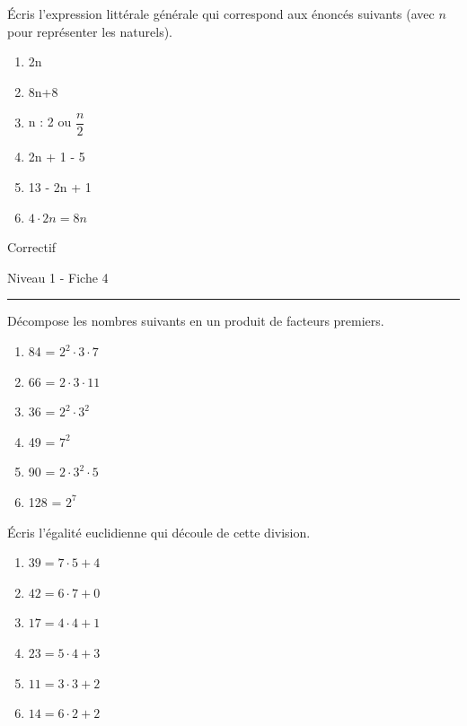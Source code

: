 \documentclass[12pt,parskip=half-, twoside=semi]{scrartcl}
\begin{document}
    \begin{exercise}
        Écris l'expression littérale générale qui correspond aux énoncés suivants (avec \(n\) pour représenter les naturels).
        \begin{enumerate}[cols=2]
            \item 2n
            \item 8n+8
            \item n : 2 ou \(\dfrac{n}{2}\) 
            \item 2n + 1 - 5 
            \item 13 - 2n + 1 
            \item \(4 \cdot 2n = 8n\) 
        \end{enumerate}
      \end{exercise}

\newpage


\begin{center}
  \bfseries
  \begin{Huge}
    Correctif
  \end{Huge}
  \smallbreak
  \begin{large}
    Niveau 1  - Fiche 4
  \end{large}
  \smallbreak
  \rule[10pt]{.5\linewidth}{1 pt}
\end{center}

\setcounter{exercise}{0}
      
      \begin{exercise}
        Décompose les nombres suivants en un produit de facteurs premiers.

          \begin{enumerate}[cols=3]
              \item 84 = $2^2 \cdot 3 \cdot 7$
              \item 66 = $2 \cdot 3 \cdot 11$
              \item 36 = $2^2 \cdot 3^2$
              \item 49 = $7^2$
              \item 90 = $2 \cdot 3^2 \cdot 5$
              \item 128 = $2^7$
            \end{enumerate}
      \end{exercise}
      
      
      \begin{exercise}
        Écris l'égalité euclidienne qui découle de cette
      division.
          \begin{enumerate}[cols=3]
            \item $39 = 7 \cdot 5 + 4$
            \item $42 = 6 \cdot 7 + 0$
            \item $17 = 4 \cdot 4 + 1$
            \item $23 = 5 \cdot 4 + 3$
            \item $11 = 3 \cdot 3 + 2$
            \item $14 = 6 \cdot 2 + 2$
          \end{enumerate}
      \end{exercise}
      
\end{document}
